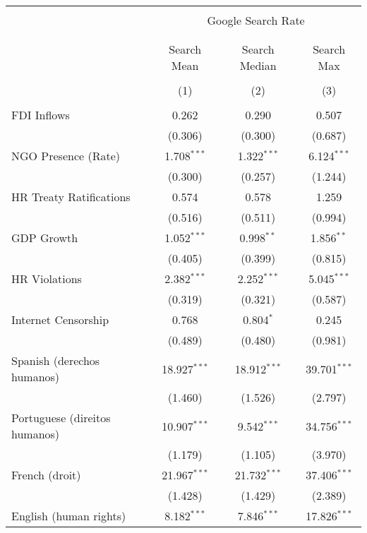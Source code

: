 
\begin{table}[!htbp] \centering 
  \caption{} 
  \label{} 
\begin{tabular}{@{\extracolsep{5pt}}lccc} 
\\[-1.8ex]\hline 
\hline \\[-1.8ex] 
 & \multicolumn{3}{c}{Google Search Rate} \\ 
\cline{2-4} 
\\[-1.8ex] & \multicolumn{3}{c}{ } \\ 
 & Search Mean & Search Median & Search Max \\ 
\\[-1.8ex] & (1) & (2) & (3)\\ 
\hline \\[-1.8ex] 
 FDI Inflows & 0.262 & 0.290 & 0.507 \\ 
  & (0.306) & (0.300) & (0.687) \\ 
  NGO Presence (Rate) & 1.708$^{***}$ & 1.322$^{***}$ & 6.124$^{***}$ \\ 
  & (0.300) & (0.257) & (1.244) \\ 
  HR Treaty Ratifications & 0.574 & 0.578 & 1.259 \\ 
  & (0.516) & (0.511) & (0.994) \\ 
  GDP Growth & 1.052$^{***}$ & 0.998$^{**}$ & 1.856$^{**}$ \\ 
  & (0.405) & (0.399) & (0.815) \\ 
  HR Violations & 2.382$^{***}$ & 2.252$^{***}$ & 5.045$^{***}$ \\ 
  & (0.319) & (0.321) & (0.587) \\ 
  Internet Censorship & 0.768 & 0.804$^{*}$ & 0.245 \\ 
  & (0.489) & (0.480) & (0.981) \\ 
  Spanish (derechos humanos) & 18.927$^{***}$ & 18.912$^{***}$ & 39.701$^{***}$ \\ 
  & (1.460) & (1.526) & (2.797) \\ 
  Portuguese (direitos humanos) & 10.907$^{***}$ & 9.542$^{***}$ & 34.756$^{***}$ \\ 
  & (1.179) & (1.105) & (3.970) \\ 
  French (droit) & 21.967$^{***}$ & 21.732$^{***}$ & 37.406$^{***}$ \\ 
  & (1.428) & (1.429) & (2.389) \\ 
  English (human rights) & 8.182$^{***}$ & 7.846$^{***}$ & 17.826$^{***}$ \\ 

\end{tabular}
\end{table}
